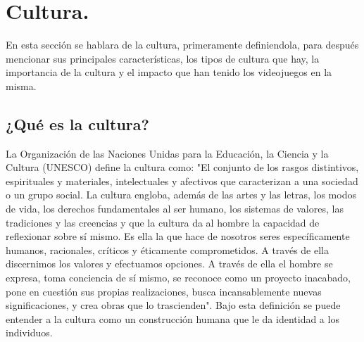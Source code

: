 \section{Cultura.}\label{cultura}
	En esta sección se hablara de la cultura, primeramente definiendola, para después 
	mencionar sus principales características, los tipos de cultura que hay, la 
	importancia de la cultura y el impacto que han tenido los videojuegos en la misma.
	\subsection{¿Qué es la cultura?}\label{CulturaDef}
	La Organización de las Naciones Unidas para la Educación, la Ciencia y la 
	Cultura (UNESCO) define la cultura como: "El conjunto de los rasgos distintivos, 
	espirituales y materiales, intelectuales y afectivos que caracterizan a una 
	sociedad o un grupo social. La cultura engloba, además de las artes y las letras, 
	los modos de vida, los derechos fundamentales al ser humano, los sistemas de 
	valores, las tradiciones y las creencias y que la cultura da al hombre la capacidad 
	de reflexionar sobre sí mismo. Es ella la que hace de nosotros seres específicamente 
	humanos, racionales, críticos y éticamente comprometidos. A través de ella discernimos 
	los valores y efectuamos opciones. A través de ella el hombre se expresa, toma 
	conciencia de sí mismo, se reconoce como un proyecto inacabado, pone en cuestión 
	sus propias realizaciones, busca incansablemente nuevas significaciones, y crea 
	obras que lo trascienden"\cite{RefCultura}. Bajo esta definición se puede entender 
	a la cultura como un construcción humana que le da identidad a los individuos. 
	
